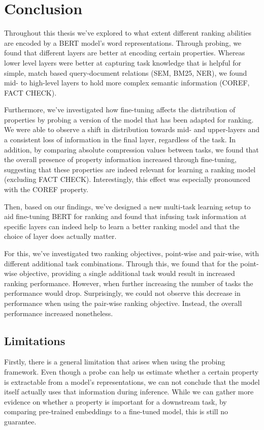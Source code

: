 \chapter{Conclusion}
\label{chap:conclusion}
Throughout this thesis we've explored to what extent different ranking abilities are encoded by a BERT model's word representations. Through probing, we found that different layers are better at encoding certain properties. Whereas lower level layers were better at capturing task knowledge that is helpful for simple, match based query-document relations (SEM, BM25, NER), we found mid- to high-level layers to hold more complex semantic information (COREF, FACT CHECK).

Furthermore, we've investigated how fine-tuning affects the distribution of properties by probing a version of the model that has been adapted for ranking. We were able to observe a shift in distribution towards mid- and upper-layers and a consistent loss of information in the final layer, regardless of the task. In addition, by comparing absolute compression values between tasks, we found that the overall presence of property information increased through fine-tuning, suggesting that these properties are indeed relevant for learning a ranking model (excluding FACT CHECK). Interestingly, this effect was especially pronounced with the COREF property.

Then, based on our findings, we've designed a new multi-task learning setup to aid fine-tuning BERT for ranking and found that infusing task information at specific layers can indeed help to learn a better ranking model and that the choice of layer does actually matter.

For this, we've investigated two ranking objectives, point-wise and pair-wise, with different additional task combinations. Through this, we found that for the point-wise objective, providing a single additional task would result in increased ranking performance. However, when further increasing the number of tasks the performance would drop. Surprisingly, we could not observe this decrease in performance when using the pair-wise ranking objective. Instead, the overall performance increased nonetheless.

\section{Limitations}
\label{sec:limitations}
Firstly, there is a general limitation that arises when using the probing framework. Even though a probe can help us estimate whether a certain property is extractable from a model's representations, we can not conclude that the model itself actually uses that information during inference. While we can gather more evidence on whether a property is important for a downstream task, by comparing pre-trained embeddings to a fine-tuned model, this is still no guarantee.

